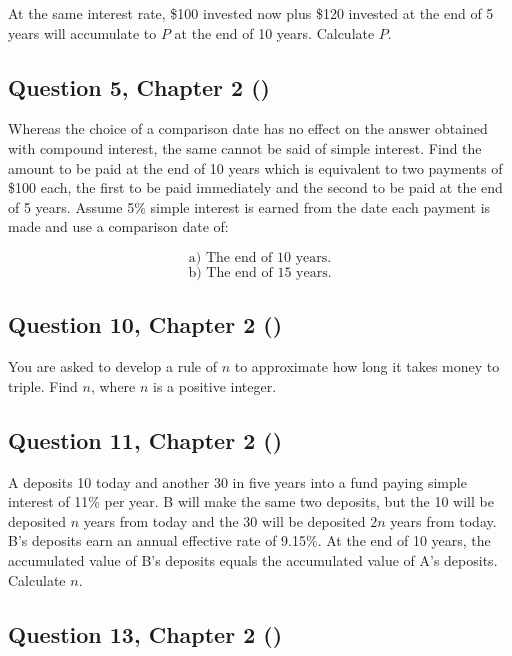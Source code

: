 \documentclass[12pt, a4paper]{article}
\begin{document}
At the same interest rate, \$100 invested now plus \$120 invested at the end of 5 years will accumulate to \( P \) at the end of 10 years. Calculate \( P \).

\bigskip


\subsection*{Question 5, Chapter 2 (\cite{toi3rd})}

\noindent Whereas the choice of a comparison date has no effect on the answer obtained with compound interest, the same cannot be said of simple interest. Find the amount to be paid at the end of 10 years which is equivalent to two payments of \$100 each, the first to be paid immediately and the second to be paid at the end of 5 years. Assume 5\% simple interest is earned from the date each payment is made and use a comparison date of:

\[
\text{a) The end of 10 years.}
\]
\[
\text{b) The end of 15 years.}
\]

\bigskip



\subsection*{Question 10, Chapter 2 (\cite{toi3rd})}

\noindent You are asked to develop a rule of \( n \) to approximate how long it takes money to triple. Find \( n \), where \( n \) is a positive integer.

\bigskip



\subsection*{Question 11, Chapter 2 (\cite{toi3rd})}

\noindent A deposits 10 today and another 30 in five years into a fund paying simple interest of 11\% per year. B will make the same two deposits, but the 10 will be deposited \( n \) years from today and the 30 will be deposited \( 2n \) years from today. B’s deposits earn an annual effective rate of 9.15\%. At the end of 10 years, the accumulated value of B’s deposits equals the accumulated value of A’s deposits. Calculate \( n \).

\bigskip


\subsection*{Question 13, Chapter 2 (\cite{toi3rd})}
\end{document}
